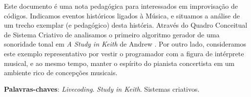 \setlength{\absparsep}{18pt} %
\begin{resumo}

Este documento é uma nota pedagógica para interessados em improvisação de códigos. Indicamos eventos históricos ligados à Música, e situamos a análise de um trecho exemplar (e pedagógico) desta história. Através do Quadro Conceitual de Sistema Criativo de  analisamos o primeiro algoritmo gerador de uma sonoridade tonal em \emph{A Study in Keith} de Andrew . Por outro lado, consideramos este exemplo representativo por vestir o programador com a figura de intérprete musical, e ao mesmo tempo, manter o espírito do pianista concertista em um ambiente rico de concepções musicais.

\vspace{\onelineskip}
\noindent
\textbf{Palavras-chaves}: \textit{Livecoding}. \emph{Study in Keith}. Sistemas criativos.
\end{resumo}

\begin{comment}
\begin{resumo}[Abstract]
 \begin{otherlanguage*}{english}

   \vspace{\onelineskip}
 
   \noindent 
   \textbf{Key-words}: latex. abntex. text editoration.
 \end{otherlanguage*}
\end{resumo}

\begin{comment}

\begin{resumo}[Résumé]
 \begi'n{otherlanguage*}{french}
    Il s'agit d'un résumé en français.
 
   \textbf{Mots-clés}: latex. abntex. publication de textes.
 \end{otherlanguage*}
\end{resumo}

\begin{resumo}[Resumen]
 \begin{otherlanguage*}{spanish}
   Este es el resumen en español.
  
   \textbf{Palabras clave}: latex. abntex. publicación de textos.
 \end{otherlanguage*}
\end{resumo}
\end{comment}